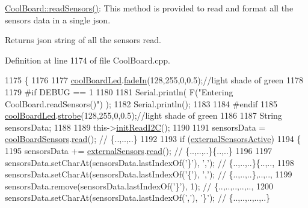 \hyperlink{class_cool_board_ad03abdce2e65f520bbf2cff0f2d083cf}{Cool\+Board\+::read\+Sensors()}\+: This method is provided to read and format all the sensors data in a single json.

\begin{DoxyReturn}{Returns}
json string of all the sensors read. 
\end{DoxyReturn}


Definition at line 1174 of file Cool\+Board.\+cpp.


\begin{DoxyCode}
1175 \{
1176 
1177     \hyperlink{class_cool_board_a1b1d3c684a5baa56b08486e192fd8e97}{coolBoardLed}.\hyperlink{class_cool_board_led_ab778f5e7bed0ab74e3906d82110493c3}{fadeIn}(128,255,0,0.5);\textcolor{comment}{//light shade of green}
1178                 
1179 \textcolor{preprocessor}{#if DEBUG == 1}
1180 
1181     Serial.println( F(\textcolor{stringliteral}{"Entering CoolBoard.readSensors()"}) );
1182     Serial.println();
1183 
1184 \textcolor{preprocessor}{#endif}
1185     \hyperlink{class_cool_board_a1b1d3c684a5baa56b08486e192fd8e97}{coolBoardLed}.\hyperlink{class_cool_board_led_ad5f0de4c628cbfbf49896042831c64ad}{strobe}(128,255,0,0.5);\textcolor{comment}{//light shade of green}
1186 
1187     String sensorsData;
1188     
1189     this->\hyperlink{class_cool_board_a397b46fadab8f530a8cf4d914c561366}{initReadI2C}();
1190 
1191     sensorsData = \hyperlink{class_cool_board_af102be5288bd7f7a8e59b13f86e26a00}{coolBoardSensors}.\hyperlink{class_cool_board_sensors_a91badb2539d91fda8679f2a597874c48}{read}(); \textcolor{comment}{// \{..,..,..\}}
1192     
1193     \textcolor{keywordflow}{if} (\hyperlink{class_cool_board_a638b00b76aeb819ecfd4c10b8cdd7bb7}{externalSensorsActive})
1194     \{
1195         sensorsData += \hyperlink{class_cool_board_a09e26264839c65873eb56af476eff6b2}{externalSensors}.\hyperlink{class_external_sensors_a53177b81eca3be89508b5511ddcd00fc}{read}(); \textcolor{comment}{// \{..,..,..\}\{..,..\}}
1196 
1197         sensorsData.setCharAt(sensorsData.lastIndexOf(\textcolor{charliteral}{'\}'}), \textcolor{charliteral}{','}); \textcolor{comment}{// \{..,..,..\}\{..,..,}
1198         sensorsData.setCharAt(sensorsData.lastIndexOf(\textcolor{charliteral}{'\{'}), \textcolor{charliteral}{','}); \textcolor{comment}{// \{..,..,..\},..,..,}
1199         sensorsData.remove(sensorsData.lastIndexOf(\textcolor{charliteral}{'\}'}), 1); \textcolor{comment}{// \{..,..,..,..,..,}
1200         sensorsData.setCharAt(sensorsData.lastIndexOf(\textcolor{charliteral}{','}), \textcolor{charliteral}{'\}'}); \textcolor{comment}{// \{..,..,..,..,..\}}

\end{DoxyCode}
